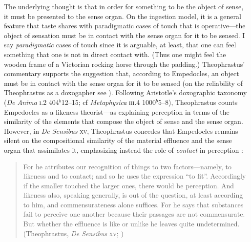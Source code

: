 
The underlying thought is that in order for something to be the object of sense, it must be presented to the sense organ. On the ingestion model, it is a general feature that taste shares with paradigmatic cases of touch that is operative---the object of sensation must be in contact with the sense organ for it to be sensed. I say \emph{paradigmatic} cases of touch since it is arguable, at least, that one can feel something that one is not in direct contact with. (Thus one might feel the wooden frame of a Victorian rocking horse through the padding.) Theophrastus' commentary supports the suggestion that, according to Empedocles, an object must be in contact with the sense organ for it to be sensed (on the reliability of Theophrastus as a doxogapher see \citealt{Kahn:1994qf}). Following Aristotle's doxographic taxonomy (\emph{De Anima} \textsc{i}.2 404\( ^{b} \)12--15; cf \emph{Metaphysica} \textsc{iii}.4 1000\( ^{b} \)5--8), Theophrastus counts Empedocles as a likeness theorist---as explaining perception in terms of the similarity of the elements that compose the object of sense and the sense organ. However, in \emph{De Sensibus} \textsc{xv}, Theophrastus concedes that Empedocles remains silent on the compositional similarity of the material effluence and the sense organ that assimilates it, emphasizing instead the role of \emph{contact} in perception \citep{Kamtekar:2009fk,Sedley:1992uq}:
\begin{quote}
	For he attributes our recognition of things to two factors---namely, to likeness and to contact; and so he uses the expression ``to fit''. Accordingly if the smaller touched the larger ones, there would be perception. And likeness also, speaking generally, is out of the question, at least according to him, and commensurateness alone suffices. For he says that substances fail to perceive one another because their passages are not commensurate. But whether the effluence is like or unlike he leaves quite undetermined. (Theophrastus, \emph{De Sensibus} \textsc{xv}; \citealt[79]{Stratton:1917vn})
\end{quote}

